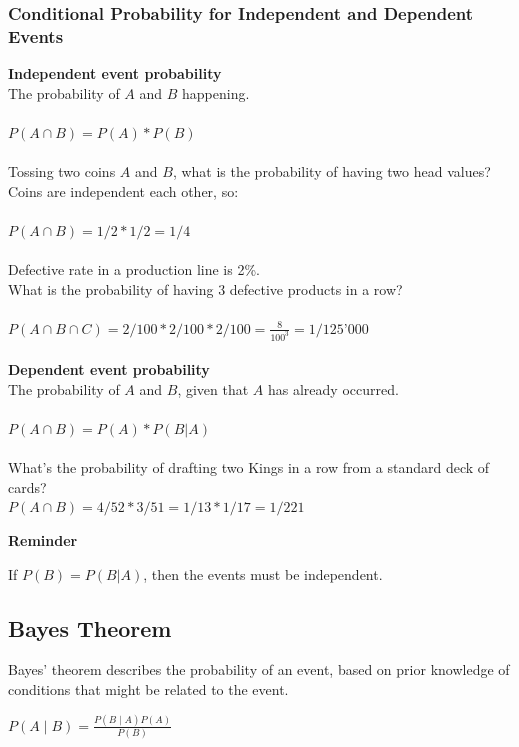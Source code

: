 \documentclass{article}
\begin{document}
\subsubsection{Conditional Probability for Independent and Dependent Events}
\textbf{Independent event probability} \\ 
The probability of $A$ and $B$ happening. \\
\mbox{} \\
$P(A \cap B) = P(A) * P(B)$ \\ 
\mbox{} \\
Tossing two coins $A$ and $B$, what is the probability of having two head values? \\ 
Coins are independent each other, so: \\ 
\mbox{} \\
$P(A \cap B) = 1 / 2 * 1 / 2 = 1 / 4 $ \\ 
\mbox{} \\
Defective rate in a production line is 2\%. \\ 
What is the probability of having 3 defective products in a row?\\
\mbox{} \\
$P(A \cap B \cap  C) = 2 / 100 * 2 / 100 * 2 / 100 = \frac{8}{100^3} = 1 / \text{125'000}$ \\ 
\mbox{} \\
\textbf{Dependent event probability}
\mbox{} \\
The probability of $A$ and $B$, given that $A$ has already occurred. \\ 
\mbox{} \\
$P(A \cap B) = P(A) * P(B | A)$ \\ 
\mbox{} \\
What’s the probability of drafting two Kings in a row from a standard deck of cards? \\

$P(A \cap B) = 4 / 52 * 3 / 51  = 1 / 13 * 1 / 17 = 1 / 221$

\textbf{Reminder}

If $P(B) = P(B | A)$, then the events must be independent.

\subsection{Bayes Theorem}
Bayes' theorem describes the probability of an event, based on prior knowledge of conditions that might be related to the event. 

$\displaystyle P(A\mid B)={\frac {P(B\mid A)P(A)}{P(B)}}$ \\ 
\end{document}
